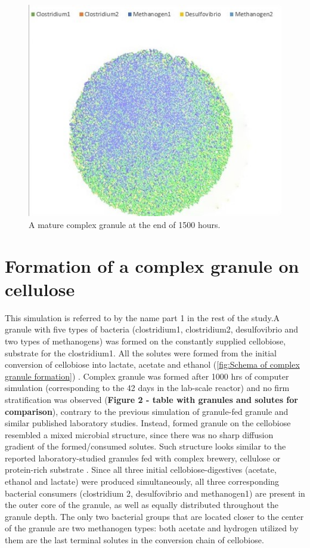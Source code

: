 \begin{figure}[htbp]
\centering
\includegraphics[width=1.0\textwidth]{images/granule.jpg}
\caption{A mature complex granule at the end of 1500 hours.}
\label{fig:granule}
\end{figure}

 
\section{Formation of a complex granule on cellulose}

This simulation is referred to by the name part 1 in the rest of the study.A granule with five types of bacteria (clostridium1, clostridium2, desulfovibrio and two types of methanogens) was formed on the constantly supplied cellobiose, substrate for the clostridium1. All the solutes were formed from the initial conversion of cellobiose into lactate, acetate and ethanol (\ref{fig:Schema of complex granule formation}) . Complex granule was formed after 1000 hrs of computer simulation (corresponding to the 42 days in the lab-scale reactor) and no firm stratification was observed (\textbf{Figure 2 - table with granules and solutes for comparison}), contrary to the previous simulation of granule-fed granule \cite{Doloman et al., 2017} and similar published laboratory studies. Instead, formed granule on the cellobiose resembled a mixed microbial structure, since there was no sharp diffusion gradient of the formed/consumed solutes. Such structure looks similar to the reported laboratory-studied granules fed with complex brewery, cellulose or protein-rich substrate \cite{batstone2004influence, diaz2006phenotypic, baloch2008structural}. Since all three initial cellobiose-digestives (acetate, ethanol and lactate) were produced simultaneously, all three corresponding bacterial consumers (clostridium 2, desulfovibrio and methanogen1) are present in the outer core of the granule, as well as equally distributed throughout the granule depth. The only two bacterial groups that are located closer to the center of the granule are two methanogen types: both acetate and hydrogen utilized by them are the last terminal solutes in the conversion chain of cellobiose. 

